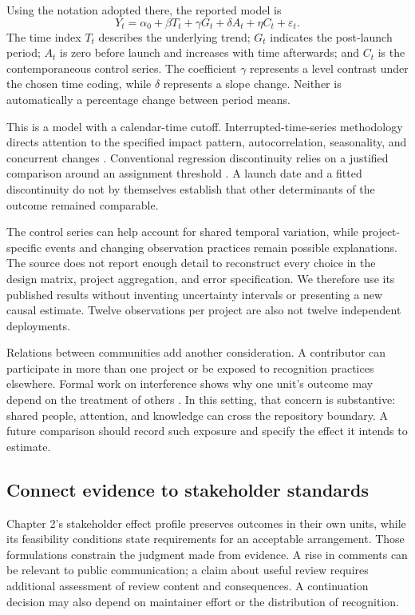 Using the notation adopted there, the reported model is
\begin{equation}
Y_t=\alpha_0+\beta T_t+\gamma G_t+\delta A_t+\eta C_t+\varepsilon_t.
\label{eq:ch3-temporal}
\end{equation}
The time index \(T_t\) describes the underlying trend; \(G_t\) indicates the post-launch period; \(A_t\) is zero before launch and increases with time afterwards; and \(C_t\) is the contemporaneous control series. The coefficient \(\gamma\) represents a level contrast under the chosen time coding, while \(\delta\) represents a slope change. Neither is automatically a percentage change between period means.

This is a model with a calendar-time cutoff. Interrupted-time-series methodology directs attention to the specified impact pattern, autocorrelation, seasonality, and concurrent changes \citep{bernal2017}. Conventional regression discontinuity relies on a justified comparison around an assignment threshold \citep{lee2010}. A launch date and a fitted discontinuity do not by themselves establish that other determinants of the outcome remained comparable.

The control series can help account for shared temporal variation, while project-specific events and changing observation practices remain possible explanations. The source does not report enough detail to reconstruct every choice in the design matrix, project aggregation, and error specification. We therefore use its published results without inventing uncertainty intervals or presenting a new causal estimate. Twelve observations per project are also not twelve independent deployments.

Relations between communities add another consideration. A contributor can participate in more than one project or be exposed to recognition practices elsewhere. Formal work on interference shows why one unit's outcome may depend on the treatment of others \citep{hudgens2008}. In this setting, that concern is substantive: shared people, attention, and knowledge can cross the repository boundary. A future comparison should record such exposure and specify the effect it intends to estimate.

\subsection{Connect evidence to stakeholder standards}
Chapter 2's stakeholder effect profile preserves outcomes in their own units, while its feasibility conditions state requirements for an acceptable arrangement. Those formulations constrain the judgment made from evidence. A rise in comments can be relevant to public communication; a claim about useful review requires additional assessment of review content and consequences. A continuation decision may also depend on maintainer effort or the distribution of recognition.

